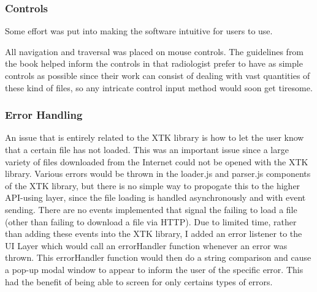 \documentclass[a4paper,11pt,titlepage]{article}
\begin{document}
\subsubsection{Controls}

Some effort was put into making the software intuitive for users to use.


All navigation and traversal was placed on mouse controls. The guidelines from the book helped inform the controls in that radiologist prefer to have as simple controls as possible since their work can consist of dealing with vast quantities of these kind of files, so any intricate control input method would soon get tiresome.










\subsubsection{Error Handling}
An issue that is entirely related to the XTK library is how to let the user know that a certain file has not loaded. This was an important issue since a large variety of files downloaded from the Internet could not be opened with the XTK library. Various errors would be thrown in the loader.js and parser.js components of the XTK library, but there is no simple way to propogate this to the higher API-using layer, since the file loading is handled asynchronously and with event sending. There are no events implemented that signal the failing to load a file (other than failing to download a file via HTTP). Due to limited time, rather than adding these events into the XTK library, I added an error listener to the UI Layer which would call an errorHandler function whenever an error was thrown. This errorHandler function would then do a string comparison and cause a pop-up modal window to appear to inform the user of the specific error. This had the benefit of being able to screen for only certains types of errors.
\end{document}
